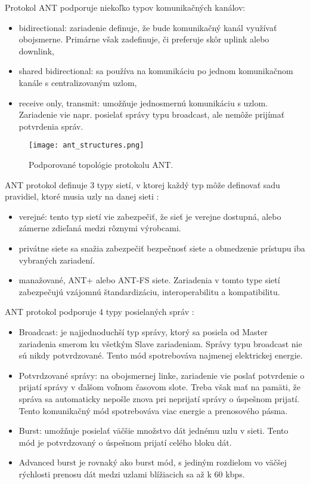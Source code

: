 \documentclass[12pt,a4paper,oneside,openright]{report}
\begin{document}
Protokol ANT podporuje niekoľko typov komunikačných kanálov:
\begin{itemize}
	\item bidirectional: zariadenie definuje, že bude komunikačný kanál využívať obojsmerne. Primárne však zadefinuje, či preferuje skôr uplink alebo downlink,
	\item shared bidirectional: sa používa na komunikáciu po jednom komunikačnom kanále s centralizovaným uzlom,
	\item receive only, transmit: umožňuje jednosmernú komunikáciu s uzlom. Zariadenie vie napr. posielať správy typu broadcast, ale nemôže prijímať potvrdenia správ.
\end{itemize}

\begin{figure*}[h]
	\centering
	\texttt{[image: ant\_structures.png]}
	\caption{Podporované topológie protokolu ANT.\cite{ANT}}
	\label{f:a_ant_network_types}
\end{figure*}

ANT protokol definuje 3 typy sietí, v ktorej každý typ môže definovať sadu pravidiel, ktoré musia uzly na danej sieti \cite{ANT}:
\begin{itemize}
	\item verejné: tento typ sietí vie zabezpečiť, že sieť je verejne dostupná, alebo zámerne zdieľaná medzi rôznymi výrobcami.
	\item privátne siete sa snažia zabezpečiť bezpečnosť siete a obmedzenie prístupu iba vybraných zariadení.%
	\item manažované, ANT+ alebo ANT-FS siete. Zariadenia v tomto type sietí zabezpečujú vzájomnú štandardizáciu, interoperabilitu a kompatibilitu.
\end{itemize}
\onehalfspacing

ANT protokol podporuje 4 typy posielaných správ \cite{ANT}:
\begin{itemize}
	\item Broadcast: je najjednoduchší typ správy, ktorý sa posiela od Master zariadenia smerom ku všetkým Slave zariadeniam. Správy typu broadcast nie sú nikdy potvrdzované. Tento mód spotrebováva najmenej elektrickej energie.
	\item Potvrdzované správy: na obojsmernej linke, zariadenie vie poslať potvrdenie o prijatí správy v ďalšom voľnom časovom slote. Treba však mať na pamäti, že správa sa automaticky nepošle znova pri neprijatí správy o úspešnom prijatí. Tento komunikačný mód spotrebováva viac energie a prenosového pásma.
	\item Burst: umožňuje posielať väčšie množstvo dát jednému uzlu v sieti. Tento mód je potvrdzovaný o úspešnom prijatí celého bloku dát.
	\item Advanced burst je rovnaký ako burst mód, s jediným rozdielom vo väčšej rýchlosti prenosu dát medzi uzlami blížiacich sa až k 60 kbps.
\end{itemize}
\onehalfspacing
\end{document}
